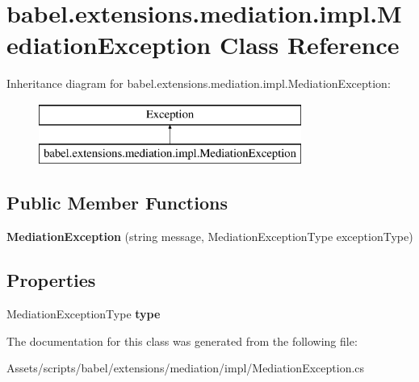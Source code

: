 \hypertarget{classbabel_1_1extensions_1_1mediation_1_1impl_1_1_mediation_exception}{\section{babel.\-extensions.\-mediation.\-impl.\-Mediation\-Exception Class Reference}
\label{classbabel_1_1extensions_1_1mediation_1_1impl_1_1_mediation_exception}
}
Inheritance diagram for babel.\-extensions.\-mediation.\-impl.\-Mediation\-Exception\-:\begin{figure}[H]
\begin{center}
\leavevmode
\includegraphics[height=2.000000cm]{classbabel_1_1extensions_1_1mediation_1_1impl_1_1_mediation_exception}
\end{center}
\end{figure}
\subsection*{Public Member Functions}
\begin{DoxyCompactItemize}
\item 
\hypertarget{classbabel_1_1extensions_1_1mediation_1_1impl_1_1_mediation_exception_a6f6429243fe7cb136fdc65da396571f3}{{\bfseries Mediation\-Exception} (string message, Mediation\-Exception\-Type exception\-Type)}\label{classbabel_1_1extensions_1_1mediation_1_1impl_1_1_mediation_exception_a6f6429243fe7cb136fdc65da396571f3}

\end{DoxyCompactItemize}
\subsection*{Properties}
\begin{DoxyCompactItemize}
\item 
\hypertarget{classbabel_1_1extensions_1_1mediation_1_1impl_1_1_mediation_exception_a446b56efe5d17591dd8703f5e19c1d3d}{Mediation\-Exception\-Type {\bfseries type}}\label{classbabel_1_1extensions_1_1mediation_1_1impl_1_1_mediation_exception_a446b56efe5d17591dd8703f5e19c1d3d}

\end{DoxyCompactItemize}


The documentation for this class was generated from the following file\-:\begin{DoxyCompactItemize}
\item 
Assets/scripts/babel/extensions/mediation/impl/Mediation\-Exception.\-cs\end{DoxyCompactItemize}
